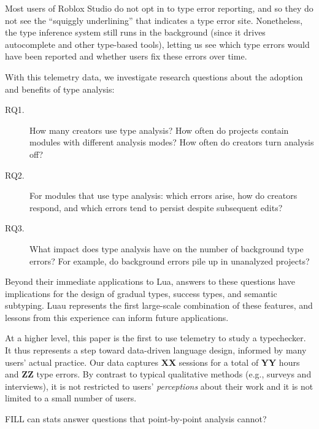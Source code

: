 \documentclass[english,submission,cleveref]{programming}
\begin{document}
Most users of {Roblox Studio} do not opt in to type error
reporting, and so they do not see the ``squiggly underlining'' that
indicates a type error site. Nonetheless, the type inference system
still runs in the background (since it drives autocomplete and other
type-based tools), letting us see which type errors would have
been reported and whether users fix these errors over time.

With this telemetry data, we investigate research questions about
the adoption and benefits of type analysis:
\begin{description}
  \item[RQ1.]
    How many creators use type analysis?
    How often do projects contain modules with different
    analysis modes?
    How often do creators turn analysis off?
  \item[RQ2.]
    For modules that use type analysis:
    which errors arise,
    how do creators respond,
    and which errors tend to persist despite subsequent edits?
  \item[RQ3.]
    What impact does type analysis have on the number of background type
    errors?
    For example, do background errors pile up in unanalyzed projects?
\end{description}

Beyond their immediate applications to {Lua},
answers to these questions have implications for the design
of gradual types, success types, and semantic subtyping.
Luau represents the first large-scale combination of these features,
and lessons from this experience can inform future applications.

At a higher level, this paper is the first to use telemetry 
to study a typechecker.
It thus represents a step toward data-driven language design,
informed by many users' actual practice.
Our data captures \textbf{XX} sessions
for a total of \textbf{YY} hours
and \textbf{ZZ} type errors.
By contrast to typical qualitative methods (e.g., surveys and interviews), it
is not restricted to users' \emph{perceptions} about their work and it is not
limited to a small number of users.

FILL can stats answer questions that point-by-point analysis cannot?
\end{document}
